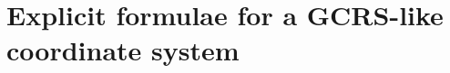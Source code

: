 \documentclass[a4paper,12pt,%
onecolumn,oneside,article,%
british%
]{memoir}
\theoremstyle{remark}
\theoremstyle{innote}
\newcommand*{\mathte}[1]{\bm{\mathsf{#1}}}
\newcommand*{\xbm}[1]{\textpdfrender{TextRenderingMode=2,LineWidth=0.1pt}{\boldsymbol{#1}}}
\newcommand*{\de}{\mathop{}\!\uppartial}%
\newcommand*{\di}{\mathop{}\!\mathrm{d}}%
\renewcommand*{\|}[1][]{\nonscript\:#1\vert\nonscript\:\mathopen{}}
\newcommand*{\chap}{ch.}%
\newcommand*{\ddi}{\xbm{\di}}
\newcommand*{\se}[1]{\de_{#1}}
\newcommand*{\si}[1]{\di{#1}}
\newcommand*{\ssi}[1]{\di^{2}{#1}}
\newcommand*{\sssi}[1]{\di^{3}{#1}}
\newcommand*{\yF}{\mathte{F}}
\newcommand*{\yE}{\bm{E}}
\newcommand*{\yB}{\mathte{B}}
\begin{document}
% 
% 
% 
% 


\section{Explicit formulae for a GCRS-like coordinate system}
\label{sec:equations_on_earth}
\end{document}
